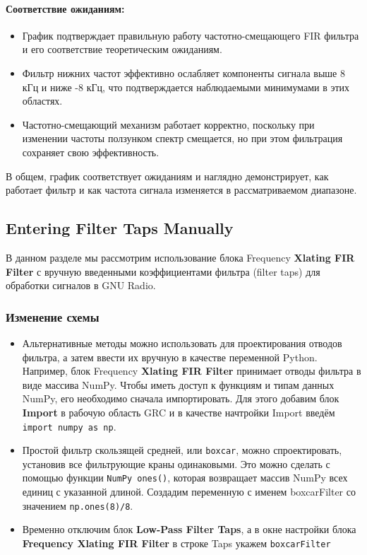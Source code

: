 \documentclass[a4paper,12pt]{extarticle}
\begin{document}
\paragraph{Соответствие ожиданиям:}
\begin{itemize}
    \item График подтверждает правильную работу частотно-смещающего FIR фильтра и его соответствие теоретическим ожиданиям.
    \item Фильтр нижних частот эффективно ослабляет компоненты сигнала выше 8 кГц и ниже -8 кГц, что подтверждается наблюдаемыми минимумами в этих областях.
    \item Частотно-смещающий механизм работает корректно, поскольку при изменении частоты ползунком спектр смещается, но при этом фильтрация сохраняет свою эффективность.
\end{itemize}

В общем, график соответствует ожиданиям и наглядно демонстрирует, как работает фильтр и как 
частота сигнала изменяется в рассматриваемом диапазоне.

\subsection{Entering Filter Taps Manually}

\hspace{1.15cm}В данном разделе мы рассмотрим использование блока Frequency \textbf{Xlating FIR Filter} с вручную 
введенными коэффициентами фильтра (filter taps) для обработки сигналов в GNU Radio.

\subsubsection{Изменение схемы}

\begin{itemize}
    \item Альтернативные методы можно использовать для проектирования отводов фильтра, а затем ввести 
    их вручную в качестве переменной Python. Например, блок Frequency \textbf{Xlating FIR Filter} 
    принимает отводы фильтра в виде массива NumPy. Чтобы иметь доступ к функциям и типам данных 
    NumPy, его необходимо сначала импортировать. Для этого добавим блок \textbf{Import} в рабочую 
    область GRC и в качестве начтройки Import введём \texttt{import numpy as np}.
    \item Простой фильтр скользящей средней, или \texttt{boxcar}, можно спроектировать, установив 
    все фильтрующие краны одинаковыми. Это можно сделать с помощью функции \texttt{NumPy ones()}, 
    которая возвращает массив NumPy всех единиц с указанной длиной. Создадим переменную с именем 
    boxcarFilter со значением \texttt{np.ones(8)/8}.
    \item Временно отключим блок \textbf{Low-Pass Filter Taps}, а в окне настройки блока 
    \textbf{Frequency Xlating FIR Filter} в строке Taps укажем \texttt{boxcarFilter}
\end{itemize}
\end{document}
